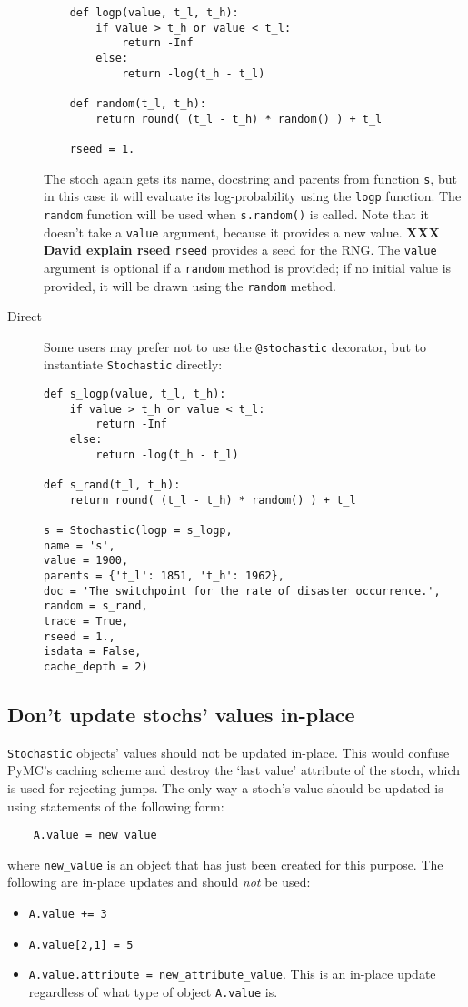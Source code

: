 \begin{description}
\begin{verbatim}
    def logp(value, t_l, t_h):
        if value > t_h or value < t_l:
            return -Inf
        else:
            return -log(t_h - t_l) 
            
    def random(t_l, t_h):
        return round( (t_l - t_h) * random() ) + t_l

    rseed = 1.
    \end{verbatim}
The stoch again gets its name, docstring and parents from function \texttt{s}, but in this case it will evaluate its log-probability using the \texttt{logp} function. The \texttt{random} function will be used when \texttt{s.random()} is called. Note that it doesn't take a \texttt{value} argument, because it provides a new value. \textbf{XXX David explain rseed} \texttt{rseed} provides a seed for the RNG. The \texttt{value} argument is optional if a \texttt{random} method is provided; if no initial value is provided, it will be drawn using the \texttt{random} method.

    \item[Direct] Some users may prefer not to use the \texttt{@stochastic} decorator, but to instantiate \texttt{Stochastic} directly:
\begin{verbatim}
def s_logp(value, t_l, t_h):
    if value > t_h or value < t_l:
        return -Inf
    else:
        return -log(t_h - t_l) 

def s_rand(t_l, t_h):
    return round( (t_l - t_h) * random() ) + t_l

s = Stochastic(logp = s_logp, 
name = 's', 
value = 1900,
parents = {'t_l': 1851, 't_h': 1962},
doc = 'The switchpoint for the rate of disaster occurrence.',
random = s_rand, 
trace = True, 
rseed = 1., 
isdata = False,
cache_depth = 2)
\end{verbatim}
\end{description}

\subsection{Don't update stochs' values in-place}\label{sub:warning}

\texttt{Stochastic} objects' values should not be updated in-place. This would confuse PyMC's caching scheme and destroy the `last value' attribute of the stoch, which is used for rejecting jumps. The only way a stoch's value should be updated is using statements of the following form:
\begin{verbatim}
    A.value = new_value
\end{verbatim}
where \texttt{new\_value} is an object that has just been created for this purpose. The following are in-place updates and should \emph{not} be used:
\begin{itemize}
    \item \texttt{A.value += 3}
    \item \texttt{A.value[2,1] = 5}
    \item \texttt{A.value.attribute = new_attribute_value}. This is an in-place update regardless of what type of object \texttt{A.value} is.
\end{itemize}

